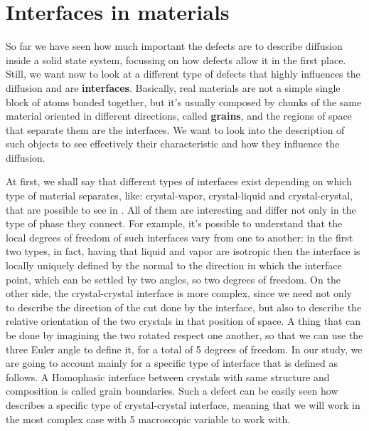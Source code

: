 \section{Interfaces in materials}

So far we have seen how much important the defects are to describe diffusion inside a solid state system, focussing on how defects allow it in the first place.  Still, we want now to look at a different type of defects that highly influences the diffusion and are \textbf{interfaces}. Basically, real materials are not a simple single block of atoms bonded together, but it's usually composed by chunks of the same material oriented in different directions, called \textbf{grains}, and the regions of space that separate them are the interfaces. We want to look into the description of such objects to see effectively their characteristic and how they influence the diffusion.

At first, we shall say that different types of interfaces exist depending on which type of material separates, like: crystal-vapor, crystal-liquid and crystal-crystal, that are possible to see in . All of them are interesting and differ not only in the type of phase they connect. For example, it's possible to understand that the local degrees of freedom of such interfaces vary from one to another: in the first two types, in fact, having that liquid and vapor are isotropic then the interface is locally uniquely defined by the normal to the direction in which the interface point, which can be settled by two angles, so two degrees of freedom. On the other side, the crystal-crystal interface is more complex, since we need not only to describe the direction of the cut done by the interface, but also to describe the relative orientation of the two crystals in that position of space. A thing that can be done by imagining the two rotated respect one another, so that we can use the three Euler angle to define it, for a total of 5 degrees of freedom. In our study, we are going to account mainly for a specific type of interface that is defined as follows.
{
    A Homophasic interface between crystals with same structure and composition is called grain boundaries.
}
\noindent
Such a defect can be easily seen how describes a specific type of crystal-crystal interface, meaning that we will work in the most complex case with 5 macroscopic variable to work with.


